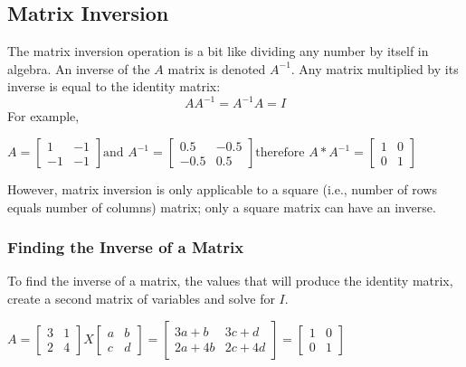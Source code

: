 \documentclass[11pt,openany]{book}\usepackage[]{graphicx}\usepackage[]{color}
\begin{document}
{\subsection{Matrix Inversion}

The matrix inversion operation is a bit like dividing any number by itself in algebra. An inverse of the $A$ matrix is denoted $A^{-1}$. Any matrix multiplied by its inverse is equal to the identity matrix: 
\begin{equation*}
  AA^{-1} = A^{-1}A = I 
\end{equation*}
For example, 

$A = 
\begin{bmatrix}
  1 & -1 \\
  -1 & -1 
\end{bmatrix}
\text{and } 
A^{-1} = 
\begin{bmatrix}
  0.5 & -0.5 \\
  -0.5 & 0.5 
\end{bmatrix}
\text{therefore }  
A*A^{-1} = 
\begin{bmatrix}
  1 & 0 \\
  0 & 1
\end{bmatrix}$

However, matrix inversion is only applicable to a square (i.e., number of rows equals number of columns) matrix; only a square matrix can have an inverse.

\subsubsection{Finding the Inverse of a Matrix}

To find the inverse of a matrix, the values that will produce the identity matrix, create a second matrix of variables and solve for $I$.

$A = 
\begin{bmatrix}
  3 & 1 \\
  2 & 4 
\end{bmatrix}
X
\begin{bmatrix}
a & b \\
c & d 
\end{bmatrix}
=
\begin{bmatrix}
 3a+b & 3c+d \\
 2a+4b & 2c+4d
\end{bmatrix}
=
\begin{bmatrix}
  1 & 0 \\
  0 & 1
\end{bmatrix}$


}
\end{document}

